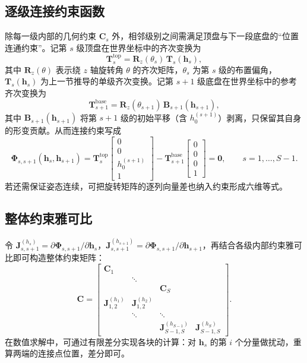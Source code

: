 \documentclass[12pt,a4paper]{article}
\begin{document}
\subsection{逐级连接约束函数}
除每一级内部的几何约束 $\bm C_s$ 外，相邻级别之间需满足顶盘与下一段底盘的“位置连通约束”。记第 $s$ 级顶盘在世界坐标中的齐次变换为
\begin{equation}
  \bm T^{\text{top}}_s = \bm R_z(\theta_s)\, \bm T_s(\bm h_s),
\end{equation}
其中 $\bm R_z(\theta)$ 表示绕 $z$ 轴旋转角 $\theta$ 的齐次矩阵，$\theta_s$ 为第 $s$ 级的布置偏角，$\bm T_s(\bm h_s)$ 为上一节推导的单级齐次变换。记第 $s+1$ 级底盘在世界坐标中的参考齐次变换为
\begin{equation}
  \bm T^{\text{base}}_{s+1} = \bm R_z(\theta_{s+1})\, \bm B_{s+1}(\bm h_{s+1}),
\end{equation}
其中 $\bm B_{s+1}(\bm h_{s+1})$ 将第 $s+1$ 级的初始平移（含 $h_0^{(s+1)}$）剥离，只保留其自身的形变贡献。从而连接约束写成
\begin{equation}
  \bm \Phi_{s,s+1}(\bm h_s, \bm h_{s+1}) =
  \bm T^{\text{top}}_s\begin{bmatrix}0\\0\\h_0^{(s+1)}\\1\end{bmatrix}
  -
  \bm T^{\text{base}}_{s+1}\begin{bmatrix}0\\0\\0\\1\end{bmatrix} = \bm 0,
  \qquad s = 1,\ldots,S-1.
\end{equation}
若还需保证姿态连续，可把旋转矩阵的逐列向量差也纳入约束形成六维等式。

\subsection{整体约束雅可比}\label{sec:multi_constraints}
令 $\bm J_{s,s+1}^{(h_s)} = \partial \bm \Phi_{s,s+1} / \partial \bm h_s$，$\bm J_{s,s+1}^{(h_{s+1})} = \partial \bm \Phi_{s,s+1} / \partial \bm h_{s+1}$，再结合各级内部约束雅可比即可构造整体约束矩阵：
\begin{equation}
  \bm C =
  \begin{bmatrix}
    \bm C_1 & & & \\[-3pt]
    & \ddots & & \\[-3pt]
    & & \bm C_S & \\
    \bm J_{1,2}^{(h_1)} & \bm J_{1,2}^{(h_2)} & & \\
    & \ddots & \ddots & \\
    & & \bm J_{S-1,S}^{(h_{S-1})} & \bm J_{S-1,S}^{(h_S)}
  \end{bmatrix}.
\end{equation}
在数值求解中，可通过有限差分实现各块的计算：对 $\bm h_s$ 的第 $i$ 个分量做扰动，重算两端的连接点位置，差分即可。
\end{document}

